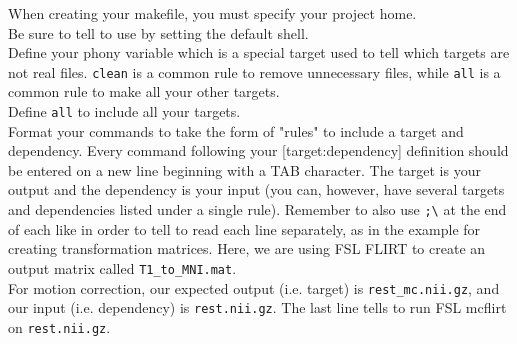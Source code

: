 When creating your makefile, you must specify your project home. \\
\indent{}Be sure to tell \maken{} to use \bashn{} by setting the default shell. \\
\indent{}Define your phony variable which is a special target used to tell \maken{} which targets are not real files. \texttt{clean} is a common rule to remove unnecessary files, while \texttt{all} is a common rule to make all your other targets. \\
\indent{}Define \texttt{all} to include all your targets. \\
\indent{}Format your commands to take the form of "rules" to include a target and dependency. Every command following your [target:dependency] definition should be entered on a new line beginning with a TAB character. The target is your output and the dependency is your input (you can, however, have several targets and dependencies listed under a single rule). Remember to also use \texttt{;\textbackslash{}} at the end of each like in order to tell \maken{} to read each line separately, as in the example for creating transformation matrices. Here, we are using FSL FLIRT to create an output matrix called \texttt{T1_to_MNI.mat}. \\ 
\indent{}For motion correction, our expected output (i.e. target) is \texttt{rest_mc.nii.gz}, and our input (i.e. dependency) is \texttt{rest.nii.gz}. The last line tells \maken{} to run FSL mcflirt on \texttt{rest.nii.gz}. 

